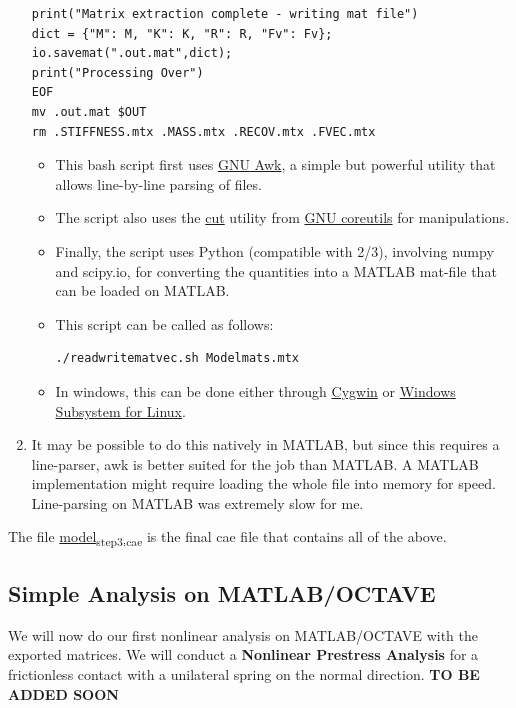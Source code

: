 \documentclass[11pt]{article}
\begin{document}
\begin{enumerate}
\begin{verbatim}
print("Matrix extraction complete - writing mat file")
dict = {"M": M, "K": K, "R": R, "Fv": Fv};
io.savemat(".out.mat",dict);
print("Processing Over")
EOF
mv .out.mat $OUT
rm .STIFFNESS.mtx .MASS.mtx .RECOV.mtx .FVEC.mtx
\end{verbatim}
\begin{itemize}
\item This bash script first uses \href{https://www.gnu.org/software/gawk/manual/gawk.html}{GNU Awk}, a simple but powerful utility that allows line-by-line parsing of files.
\item The script also uses the \href{https://www.gnu.org/software/coreutils/cut}{cut} utility from \href{https://www.gnu.org/software/coreutils/cut}{GNU coreutils} for manipulations.
\item Finally, the script uses Python (compatible with 2/3), involving numpy and scipy.io, for converting the quantities into a MATLAB mat-file that can be loaded on MATLAB.
\item This script can be called as follows:
\begin{verbatim}
./readwritematvec.sh Modelmats.mtx
\end{verbatim}
\item In windows, this can be done either through \href{https://www.cygwin.com/}{Cygwin} or \href{https://learn.microsoft.com/en-us/windows/wsl/install}{Windows Subsystem for Linux}.
\end{itemize}
\item It may be possible to do this natively in MATLAB, but since this requires a line-parser, awk is better suited for the job than MATLAB.
A MATLAB implementation might require loading the whole file into memory for speed.
Line-parsing on MATLAB was extremely slow for me.
\end{enumerate}
The file \href{https://github.com/Nidish96/Abaqus4Joints/blob/main/assets/assembly/model\_step3.cae}{model\textsubscript{step3.cae}} is the final cae file that contains all of the above.
\subsection{Simple Analysis on MATLAB/OCTAVE}
\label{sec:orgb063af4}
We will now do our first nonlinear analysis on MATLAB/OCTAVE with the exported matrices.
We will conduct a \textbf{Nonlinear Prestress Analysis} for a frictionless contact with a unilateral spring on the normal direction.
\textbf{TO BE ADDED SOON}
\end{document}
